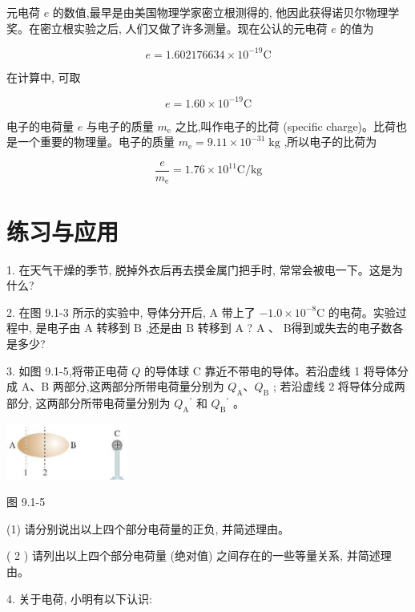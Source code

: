 \documentclass[10pt]{article}
\begin{document}
元电荷 \(e\) 的数值,最早是由美国物理学家密立根测得的, 他因此获得诺贝尔物理学奖。在密立根实验之后, 人们又做了许多测量。现在公认的元电荷 \(e\) 的值为

\[
e = {1.602176634} \times {10}^{-{19}}\mathrm{C}
\]

在计算中, 可取

\[
e = {1.60} \times {10}^{-{19}}\mathrm{C}
\]

电子的电荷量 \(e\) 与电子的质量 \({m}_{\mathrm{e}}\) 之比,叫作电子的比荷 (specific charge)。比荷也是一个重要的物理量。电子的质量 \({m}_{\mathrm{e}} = {9.11} \times {10}^{-{31}}\mathrm{\;{kg}}\) ,所以电子的比荷为

\[
\frac{e}{{m}_{\mathrm{e}}} = {1.76} \times {10}^{11}\mathrm{C}/\mathrm{{kg}}
\]

\section*{练习与应用}

1. 在天气干燥的季节, 脱掉外衣后再去摸金属门把手时, 常常会被电一下。这是为什么?

2. 在图 9.1-3 所示的实验中, 导体分开后, A 带上了 \(- {1.0} \times {10}^{-8}\mathrm{C}\) 的电荷。实验过程中, 是电子由 \(\mathrm{A}\) 转移到 \(\mathrm{B}\) ,还是由 \(\mathrm{B}\) 转移到 \(\mathrm{A}\) ? \(\mathrm{A}\) 、 B得到或失去的电子数各是多少?

3. 如图 9.1-5,将带正电荷 \(Q\) 的导体球 \(\mathrm{C}\) 靠近不带电的导体。若沿虚线 1 将导体分成 A、B 两部分,这两部分所带电荷量分别为 \({Q}_{\mathrm{A}}\text{、}{Q}_{\mathrm{B}}\) ; 若沿虚线 2 将导体分成两部分, 这两部分所带电荷量分别为 \({Q}_{\mathrm{A}}{}^{\prime }\) 和 \({Q}_{\mathrm{B}}{}^{\prime }\) 。

\begin{center}
\includegraphics[max width=0.3\textwidth]{images/01911d5f-8e38-70c0-b5b8-2b399bd115b6_10_271049.jpg}
\end{center}

图 9.1-5

(1) 请分别说出以上四个部分电荷量的正负, 并简述理由。

( 2 ) 请列出以上四个部分电荷量 (绝对值) 之间存在的一些等量关系, 并简述理由。

4. 关于电荷, 小明有以下认识:
\end{document}
